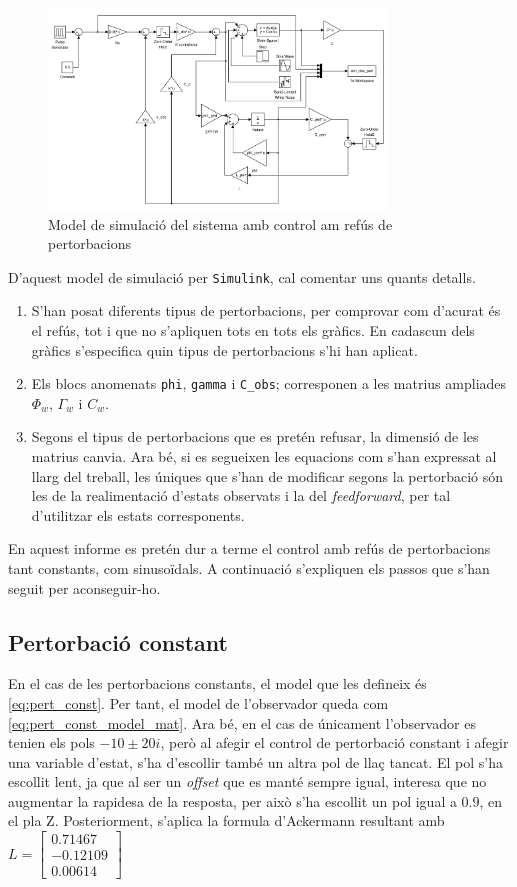 \documentclass[12pt,a4paper,final,twoside,openright]{report}
\begin{document}
\begin{figure}[ht]
\centering
\includegraphics[width=0.8\textwidth]{Imatges/pert_sim.pdf}
\caption{Model de simulació del sistema amb control am refús de pertorbacions\label{fig:pert_sim}}
\end{figure}

D'aquest model de simulació per \texttt{Simulink}, cal comentar uns quants detalls.
\begin{enumerate}
\item S'han posat diferents tipus de pertorbacions, per comprovar com d'acurat és el refús, tot i que no s'apliquen tots en tots els gràfics. En cadascun dels gràfics s'especifica quin tipus de pertorbacions s'hi han aplicat.
\item Els blocs anomenats \texttt{phi}, \texttt{gamma} i \texttt{C\_obs}; corresponen a les matrius ampliades $\Phi_w$, $\Gamma_w$ i $C_w$.
\item Segons el tipus de pertorbacions que es pretén refusar, la dimensió de les matrius canvia. Ara bé, si es segueixen les equacions com s'han expressat al llarg del treball, les úniques que s'han de modificar segons la pertorbació són les de la realimentació d'estats observats i la del \textit{feedforward}, per tal d'utilitzar els estats corresponents.
\end{enumerate}

En aquest informe es pretén dur a terme el control amb refús de pertorbacions tant constants, com sinusoïdals. A continuació s'expliquen els passos que s'han seguit per aconseguir-ho.

\subsection{Pertorbació constant}

En el cas de les pertorbacions constants, el model que les defineix és \eqref{eq:pert_const}. Per tant, el model de l'observador queda com \eqref{eq:pert_const_model_mat}. Ara bé, en el cas de únicament l'observador es tenien els pols $-10\pm20i$, però al afegir el control de pertorbació constant i afegir una variable d'estat, s'ha d'escollir també un altra pol de llaç tancat. El pol s'ha escollit lent, ja que al ser un \textit{offset} que es manté sempre igual, interesa que no augmentar la rapidesa de la resposta, per això s'ha escollit un pol igual a $0.9$, en el pla Z.  Posteriorment, s'aplica la formula d'Ackermann resultant amb $L=\begin{bmatrix}
0.71467\\
-0.12109\\
0.00614
\end{bmatrix}$
\end{document}
